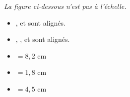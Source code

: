 \documentclass[exercice, a4]{thedocument}%
\begin{document}
%
    \emph{La figure ci-dessous n'est pas à l'échelle.}

    \begin{minipage}{0.48\linewidth}
        \begin{itemize}
            \item {},  et  sont alignés.
            \item {}, ,  et  sont alignés.
            \item {} $= 8,2$ cm
            \item {} $= 1,8$ cm
            \item {} $= 4,5$ cm
        \end{itemize}
    \end{minipage}\hfill
    \def\showsymbs{%
        \tkzMarkRightAngle[size=0.4](C,B,A)
        \tkzMarkRightAngle[size=0.4](D,A,O)

        \node[left] at (O) {\mathspoint{O}};
        \node[left] at (A) {\mathspoint{A}};
        \node[right] at (D) {\mathspoint{D}};
        \node[above left] at (B) {\mathspoint{B}};
        \node[above right] at (C) {\mathspoint{C}};
    }
    \begin{minipage}{0.48\linewidth}
    \end{minipage}

    \medskip
\end{document}
